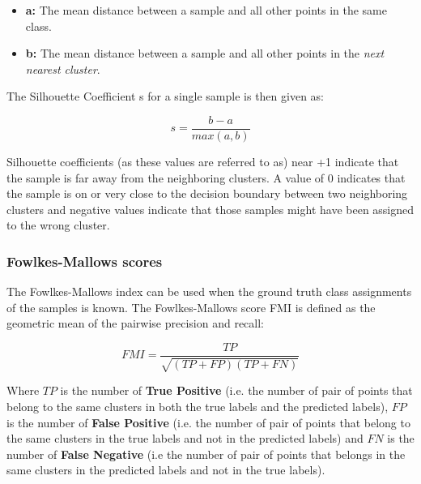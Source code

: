 \documentclass[a4paper, 12pt]{article}
\begin{document}
\begin{itemize}
    \item \textbf{a:} The mean distance between a sample and all other points in the same class.
    \item \textbf{b:} The mean distance between a sample and all other points in the \textit{next nearest cluster}.
\end{itemize}

The Silhouette Coefficient s for a single sample is then given as:

\begin{equation} \label{eq19}
    s = \frac{b - a}{max(a,b)}
\end{equation}

Silhouette coefficients (as these values are referred to as) near +1 indicate that the sample is far away from the neighboring clusters. A value of 0 indicates that the sample is on or very close to the decision boundary between two neighboring clusters and negative values indicate that those samples might have been assigned to the wrong cluster.

\subsubsection{Fowlkes-Mallows scores}

The Fowlkes-Mallows index \citep{fowlkes1983method} can be used when the ground truth class assignments of the samples is known. The Fowlkes-Mallows score FMI is defined as the geometric mean of the pairwise precision and recall:

\begin{equation} \label{eq20}
    FMI = \frac{TP}{\sqrt{(TP + FP)(TP + FN)}}
\end{equation}

Where $TP$ is the number of \textbf{True Positive} (i.e. the number of pair of points that belong to the same clusters in both the true labels and the predicted labels), $FP$ is the number of \textbf{False Positive} (i.e. the number of pair of points that belong to the same clusters in the true labels and not in the predicted labels) and $FN$ is the number of \textbf{False Negative} (i.e the number of pair of points that belongs in the same clusters in the predicted labels and not in the true labels).
\end{document}
